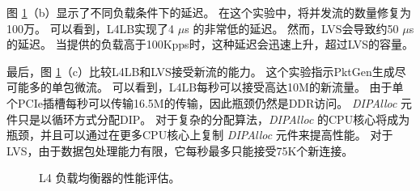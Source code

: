 图 \ref {clicknp:fig:l4}（b）显示了不同负载条件下的延迟。
在这个实验中，将并发流的数量修复为100万。
可以看到，L4LB实现了4 $\mu$s 的非常低的延迟。
然而，LVS会导致约50 $\mu$s 的延迟。
当提供的负载高于100Kpps时，这种延迟会迅速上升，超过LVS的容量。

最后，图 \ref {clicknp:fig:l4}（c）比较L4LB和LVS接受新流的能力。
这个实验指示PktGen生成尽可能多的单包微流。
可以看到，L4LB每秒可以接受高达10M的新流量。
由于单个PCIe插槽每秒可以传输16.5M的传输，因此瓶颈仍然是DDR访问。
\textit {DIPAlloc} 元件只是以循环方式分配DIP。
对于复杂的分配算法，\textit {DIPAlloc} 的CPU核心将成为瓶颈，并且可以通过在更多CPU核心上复制 \textit {DIPAlloc} 元件来提高性能。
对于LVS，由于数据包处理能力有限，它每秒最多只能接受75K个新连接。


\begin{figure}[htbp]
	\centering
	
	
	
	\caption{L4 负载均衡器的性能评估。}
	\label{clicknp:fig:l4}
	
\end{figure}



